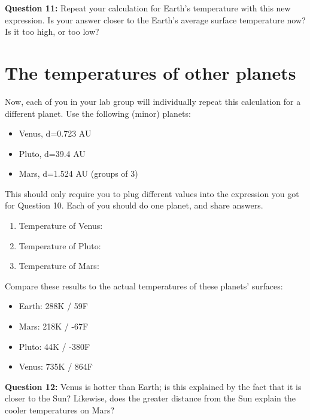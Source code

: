 \documentclass[11pt]{article}
\def\BI{\begin{itemize}}
\def\EI{\end{itemize}}
\begin{document}
\vspace*{4cm}

\hrulefill

{\bf Question 11:} Repeat your calculation for Earth's temperature with this new expression. Is your answer closer to the Earth's average surface temperature now? Is it too high, or 
too low?

\vspace*{4cm}

\hrulefill



\section*{The temperatures of other planets}

Now, each of you in your lab group will individually repeat this calculation for a different planet. Use the following (minor) planets:

\BI
\item Venus, d=0.723 AU
\item Pluto, d=39.4 AU 
\item Mars, d=1.524 AU (groups of 3)
\EI

This should only require you to plug different values into the expression you got for Question 10. Each of you should do one planet, and share answers. 

\begin{enumerate}

\item Temperature of Venus:
\bigskip
\item Temperature of Pluto:
\bigskip
\item Temperature of Mars:
\bigskip

\end{enumerate}

Compare these results to the actual
temperatures of these planets' surfaces:

\BI
\item Earth: 288K / 59F
\item Mars: 218K / -67F 
\item Pluto: 44K / -380F
\item Venus: 735K / 864F
\EI
\newpage
{\bf Question 12:} 
Venus is hotter than Earth; is this explained by the fact that it is closer to the Sun? Likewise, does the greater distance from the Sun explain the cooler temperatures on Mars?

\vspace{1.5in}
\hrulefill
\end{document}
